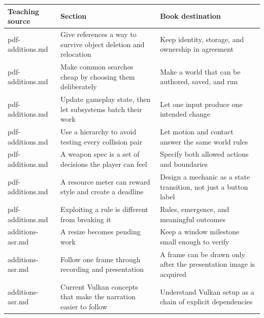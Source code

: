 {\def\LTcaptype{none} %
\begin{longtable}[]{@{}
  >{\raggedright\arraybackslash}p{}
  >{\raggedright\arraybackslash}p{}
  >{\raggedright\arraybackslash}p{}@{}}
\toprule\noalign{}
\begin{minipage}[b]{\linewidth}\raggedright
Teaching source
\end{minipage} & \begin{minipage}[b]{\linewidth}\raggedright
Section
\end{minipage} & \begin{minipage}[b]{\linewidth}\raggedright
Book destination
\end{minipage} \\
\midrule\noalign{}
\endhead
\bottomrule\noalign{}
\endlastfoot
pdf-additions.md & Give references a way to survive object deletion and relocation & Keep identity, storage, and ownership in agreement \\
pdf-additions.md & Make common searches cheap by choosing them deliberately & Make a world that can be authored, saved, and run \\
pdf-additions.md & Update gameplay state, then let subsystems batch their work & Let one input produce one intended change \\
pdf-additions.md & Use a hierarchy to avoid testing every collision pair & Let motion and contact answer the same world rules \\
pdf-additions.md & A weapon spec is a set of decisions the player can feel & Specify both allowed actions and boundaries \\
pdf-additions.md & A resource meter can reward style and create a deadline & Design a mechanic as a state transition, not just a button label \\
pdf-additions.md & Exploiting a rule is different from breaking it & Rules, emergence, and meaningful outcomes \\
additions-asr.md & A resize becomes pending work & Keep a window milestone small enough to verify \\
additions-asr.md & Follow one frame through recording and presentation & A frame can be drawn only after the presentation image is acquired \\
additions-asr.md & Current Vulkan concepts that make the narration easier to follow & Understand Vulkan setup as a chain of explicit dependencies \\

\end{longtable}}
